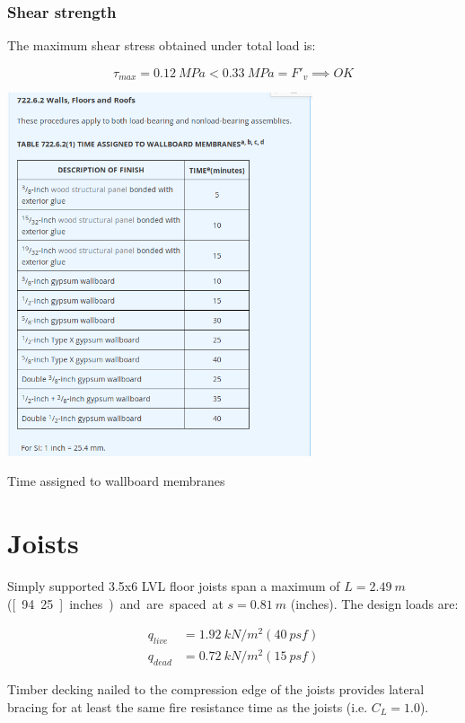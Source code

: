 \documentclass[a4paper,11pt]{xc_memo}
\begin{document}
\subsubsection{Shear strength}
The maximum shear stress obtained under total load is:

\begin{equation}
  \tau_{max}= 0.12\ MPa < 0.33\ MPa = F'_v \implies OK
\end{equation}


\begin{table}
  \begin{center}
    \includegraphics[width= 90mm]{fire_resistance_wallboard_membranes}
  \end{center}
  \caption{Time assigned to wallboard membranes}\label{tb_fire_resistance_wallboard_membranes}
\end{table}


\section{Joists}
Simply supported 3.5x6 LVL floor joists span a maximum of $L= 2.49\ m$ (\unit[94.25]{inches}) and are spaced at $s= 0.81\ m$ (\unit[32]{inches}). The design loads are:

\begin{align}
  q_{live}&= 1.92\ kN/m^2 (40\ psf) \\
  q_{dead}&= 0.72\ kN/m^2 (15\ psf)
\end{align}

Timber decking nailed to the compression edge of the joists provides lateral bracing for at least the same fire resistance time as the joists (i.e. $C_L= 1.0$).
\end{document}
